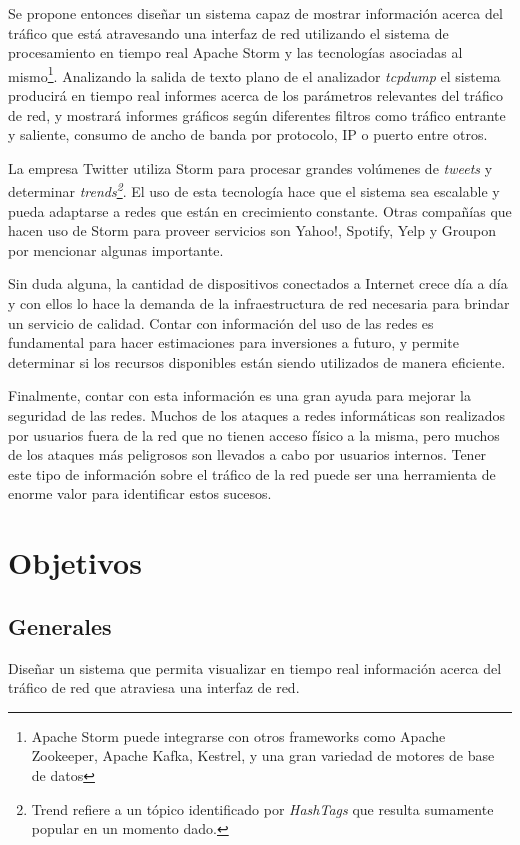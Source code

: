 Se propone entonces diseñar un sistema capaz de mostrar información acerca del tráfico que está atravesando una interfaz de red utilizando el sistema de procesamiento en tiempo real Apache Storm y las tecnologías asociadas al mismo\footnote{Apache Storm puede integrarse con otros frameworks como Apache Zookeeper, Apache Kafka, Kestrel, y una gran variedad de motores de base de datos}. Analizando la salida de texto plano de el analizador \textit{tcpdump} el sistema producirá en tiempo real informes acerca de los parámetros relevantes del tráfico de red, y mostrará informes gráficos según diferentes filtros como tráfico entrante y saliente, consumo de ancho de banda por protocolo, IP o puerto entre otros.

La empresa Twitter utiliza Storm para procesar grandes volúmenes de \textit{tweets} y determinar \textit{trends\footnote{Trend refiere a un tópico identificado por \textit{HashTags} que resulta sumamente popular en un momento dado.}}. El uso de esta tecnología hace que el sistema sea escalable y pueda adaptarse a redes que están en crecimiento constante. Otras compañías que hacen uso de Storm para proveer servicios son Yahoo!, Spotify, Yelp y Groupon por mencionar algunas importante.

Sin duda alguna, la cantidad de dispositivos conectados a Internet crece día a día y con ellos lo hace la demanda de la infraestructura de red necesaria para brindar un servicio de calidad. Contar con información del uso de las redes es fundamental para hacer estimaciones para inversiones a futuro, y permite determinar si los recursos disponibles están siendo utilizados de manera eficiente.

Finalmente, contar con esta información es una gran ayuda para mejorar la seguridad de las redes. Muchos de los ataques a redes informáticas son realizados por usuarios fuera de la red que no tienen acceso físico a la misma, pero muchos de los ataques más peligrosos son llevados a cabo por usuarios internos. Tener este tipo de información sobre el tráfico de la red puede ser una herramienta de enorme valor para identificar estos sucesos.

\section*{Objetivos}
\subsection*{Generales}
Diseñar un sistema que permita visualizar en tiempo real información acerca del tráfico de red que atraviesa una interfaz de red.
